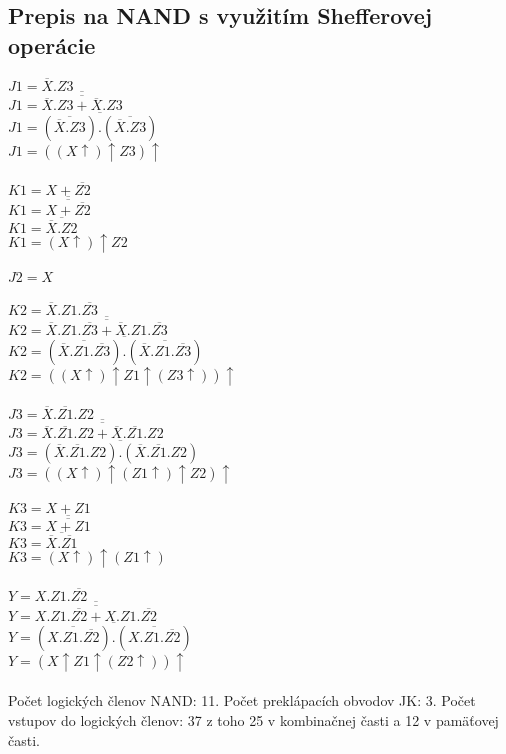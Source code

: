 \documentclass{article}
\begin{document}
\subsection{Prepis na NAND s využitím Shefferovej operácie}
$J1 = \overline{X}.Z3$\\
$J1 = \overline{\overline{\overline{X}.Z3+\overline{X}.Z3}}$\\
$J1 = \overline{(\overline{\overline{X}.Z3}).(\overline{\overline{X}.Z3})}$\\
$J1 = ((X\uparrow)\uparrow Z3)\uparrow$\\\\
$K1 = X+\overline{Z2}$\\
$K1 = \overline{\overline{X+\overline{Z2}}}$\\
$K1 = \overline{\overline{X}.Z2}$\\
$K1 = (X\uparrow)\uparrow Z2$\\\\
$J2 = X$\\\\
$K2 = \overline{X}.Z1.\overline{Z3}$\\
$K2 = \overline{\overline{\overline{X}.Z1.\overline{Z3}+\overline{X}.Z1.\overline{Z3}}}$\\
$K2 = \overline{(\overline{\overline{X}.Z1.\overline{Z3}}).(\overline{\overline{X}.Z1.\overline{Z3}})}$\\
$K2 = ((X\uparrow)\uparrow Z1\uparrow(Z3\uparrow))\uparrow$\\\\
$J3 = \overline{X}.\overline{Z1}.Z2$\\
$J3 = \overline{\overline{\overline{X}.\overline{Z1}.Z2+\overline{X}.\overline{Z1}.Z2}}$\\
$J3 = \overline{(\overline{X}.\overline{Z1}.Z2).(\overline{X}.\overline{Z1}.Z2)}$\\
$J3 = ((X\uparrow)\uparrow(Z1\uparrow)\uparrow Z2)\uparrow$\\\\
$K3 = X+Z1$\\
$K3 = \overline{\overline{X+Z1}}$\\
$K3 = \overline{\overline{X}.\overline{Z1}}$\\
$K3 = (X\uparrow)\uparrow(Z1\uparrow)$\\\\
$Y = X.Z1.\overline{Z2}$\\
$Y = \overline{\overline{X.Z1.\overline{Z2}+X.Z1.\overline{Z2}}}$\\
$Y = \overline{(\overline{X.Z1.\overline{Z2}}).(\overline{X.Z1.\overline{Z2}})}$\\
$Y = (X\uparrow Z1\uparrow(Z2\uparrow))\uparrow$\\\\
Počet logických členov NAND: 11. 
Počet preklápacích obvodov JK: 3. 
Počet vstupov do logických členov: 37 z toho 25 v kombinačnej časti a 12 v pamäťovej časti.
\end{document}

